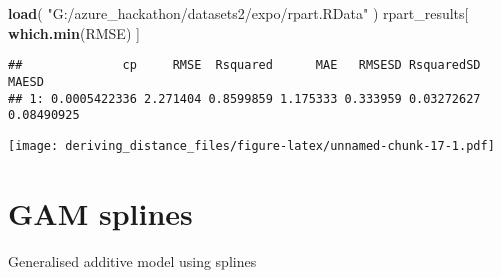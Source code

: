 \documentclass[]{article}
\newenvironment{Shaded}{\begin{snugshade}}{\end{snugshade}}
\newcommand{\DataTypeTok}[1]{\textcolor[rgb]{0.13,0.29,0.53}{#1}}
\newcommand{\KeywordTok}[1]{\textcolor[rgb]{0.13,0.29,0.53}{\textbf{#1}}}
\newcommand{\NormalTok}[1]{#1}
\newcommand{\OperatorTok}[1]{\textcolor[rgb]{0.81,0.36,0.00}{\textbf{#1}}}
\newcommand{\StringTok}[1]{\textcolor[rgb]{0.31,0.60,0.02}{#1}}
\begin{document}
\begin{Shaded}
\begin{Highlighting}[]
\KeywordTok{load}\NormalTok{( }\StringTok{"G:/azure_hackathon/datasets2/expo/rpart.RData"}\NormalTok{ )}
\NormalTok{rpart_results[ }\KeywordTok{which.min}\NormalTok{(RMSE) ]}
\end{Highlighting}
\end{Shaded}

\begin{verbatim}
##              cp     RMSE  Rsquared      MAE   RMSESD RsquaredSD      MAESD
## 1: 0.0005422336 2.271404 0.8599859 1.175333 0.333959 0.03272627 0.08490925
\end{verbatim}

\begin{Shaded}
\end{Shaded}

\texttt{[image: deriving\_distance\_files/figure-latex/unnamed-chunk-17-1.pdf]}

\hypertarget{gam-splines}{%
\section{GAM splines}\label{gam-splines}}

Generalised additive model using splines
\end{document}

